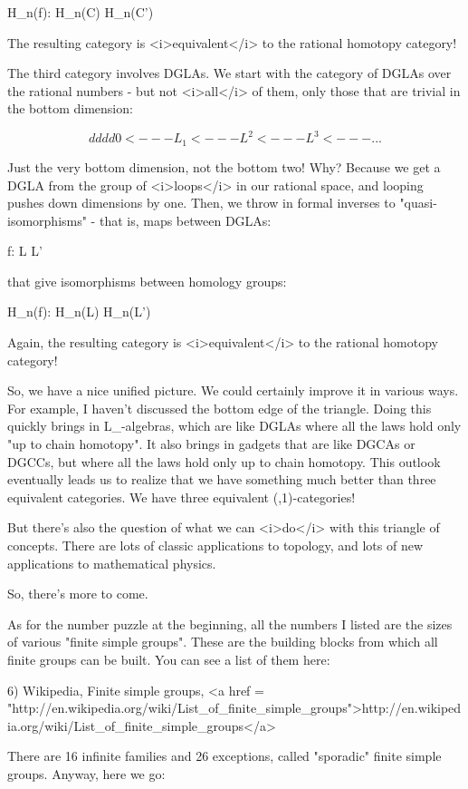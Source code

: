H_{n}(f): H_{n}(C) \to  H_{n}(C')

The resulting category is <i>equivalent</i> to the rational 
homotopy category!

The third category involves DGLAs.  We start with the category of
DGLAs over the rational numbers - but not <i>all</i> of them, only
those that are trivial in the bottom dimension:

$$
    d       d       d      d
0 <--- L_{1} <--- L^{2} <--- L^{3} <--- ...
$$
    

Just the very bottom dimension, not the bottom two!  Why?  Because we
get a DGLA from the group of <i>loops</i> in our rational space, and
looping pushes down dimensions by one.  Then, we throw in formal
inverses to "quasi-isomorphisms" - that is, maps between
DGLAs:

f: L \to  L'

that give isomorphisms between homology groups:

H_{n}(f): H_{n}(L) \to  H_{n}(L')

Again, the resulting category is <i>equivalent</i> to the rational 
homotopy category!

So, we have a nice unified picture.  We could certainly improve it in
various ways.  For example, I haven't discussed the bottom edge of the
triangle.  Doing this quickly brings in L_{\infty }-algebras,
which are like DGLAs where all the laws hold only "up to chain
homotopy".  It also brings in gadgets that are like DGCAs or
DGCCs, but where all the laws hold only up to chain homotopy.  This
outlook eventually leads us to realize that we have something much
better than three equivalent categories.  We have three equivalent
(\infty ,1)-categories!

But there's also the question of what we can <i>do</i> with this
triangle of concepts.  There are lots of classic applications
to topology, and lots of new applications to mathematical
physics.  

So, there's more to come.

As for the number puzzle at the beginning, all the numbers I listed
are the sizes of various "finite simple groups".  These
are the building blocks from which all finite groups can be built.
You can see a list of them here:

6) Wikipedia, Finite simple groups, 
<a href = "http://en.wikipedia.org/wiki/List_of_finite_simple_groups">http://en.wikipedia.org/wiki/List_of_finite_simple_groups</a>

There are 16 infinite families and 26 exceptions, called "sporadic"
finite simple groups.  Anyway, here we go:

